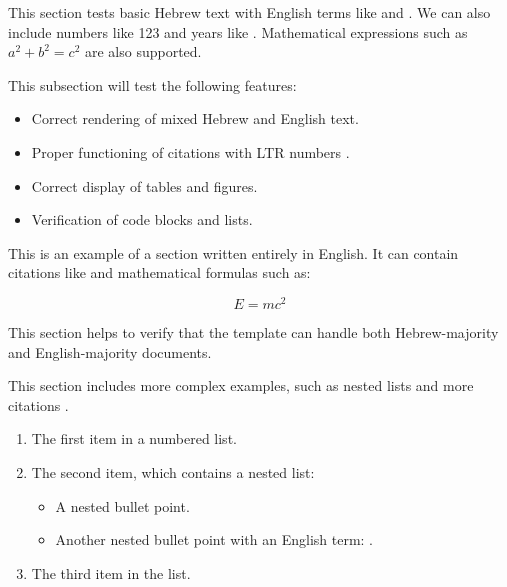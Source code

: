 \documentclass{hebrew-academic-template}
\date{\textenglish{September 2025}}
\begin{document}
\maketitle

\tableofcontents
\newpage



This section tests basic Hebrew text with English terms like  and . We can also include numbers like \num{123} and years like . Mathematical expressions such as $a^2 + b^2 = c^2$ are also supported.


This subsection will test the following features:

\begin{itemize}
    \item Correct rendering of mixed Hebrew and English text.
    \item Proper functioning of citations with LTR numbers \cite{devlin2018bert}.
    \item Correct display of tables and figures.
    \item Verification of code blocks and lists.
\end{itemize}



This is an example of a section written entirely in English. It can contain citations like \cite{vaswani2017attention} and mathematical formulas such as:

\begin{equation}
    E = mc^2
\end{equation}

This section helps to verify that the template can handle both Hebrew-majority and English-majority documents.


This section includes more complex examples, such as nested lists and more citations \cite{hebrew_nlp_2023,hebrew_linguistics_2022}.

\begin{enumerate}
    \item The first item in a numbered list.
    \item The second item, which contains a nested list:
    \begin{itemize}
        \item A nested bullet point.
        \item Another nested bullet point with an English term: .
    \end{itemize}
    \item The third item in the list.
\end{enumerate}
\end{document}
